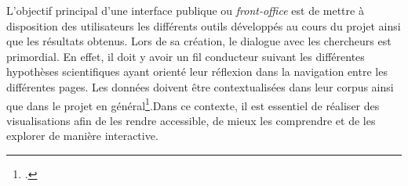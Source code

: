 L'objectif principal d'une interface publique ou \textit{front-office} est de mettre à disposition des utilisateurs les différents outils développés au cours du projet ainsi que les résultats obtenus. Lors de sa création, le dialogue avec les chercheurs est primordial. En effet, il doit y avoir un \og fil conducteur \fg suivant les différentes hypothèses scientifiques ayant orienté leur réflexion dans la navigation entre les différentes pages. Les données doivent être contextualisées dans leur corpus ainsi que dans le projet en général\footcite{albouyMediationDonneesRecherche2019}.Dans ce contexte, il est essentiel de réaliser des visualisations afin de les rendre accessible, de mieux les comprendre et de les explorer de manière interactive. 